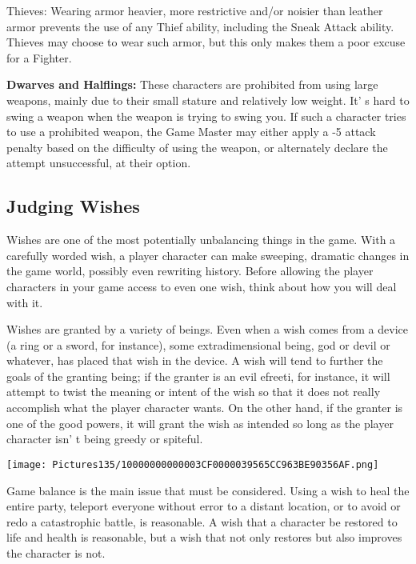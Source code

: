 \documentclass[a4paper,twoside,openany,10pt]{book}
\begin{document}
\begin{multicols}{2}
Thieves: Wearing armor heavier, more restrictive and/or noisier than leather armor prevents the use of any Thief ability, including the Sneak Attack ability. Thieves may choose to wear such armor, but this only makes them a poor excuse for a Fighter.

\textbf{Dwarves and Halflings:} These characters are prohibited from using large weapons, mainly due to their small stature and relatively low weight. It' s hard to swing a weapon when the weapon is trying to swing you. If such a character tries to use a prohibited weapon, the Game Master may either apply a -5 attack penalty based on the difficulty of using the weapon, or alternately declare the attempt unsuccessful, at their option.

\subsection{Judging Wishes}\label{judging-wishes}

Wishes are one of the most potentially unbalancing things in the game.  With a carefully worded wish, a player character can make sweeping, dramatic changes in the game world, possibly even rewriting history. Before allowing the player characters in your game access to even one wish, think about how you will deal with it.

Wishes are granted by a variety of beings. Even when a wish comes from a device (a ring or a sword, for instance), some extradimensional being, god or devil or whatever, has placed that wish in the device. A wish will tend to further the goals of the granting being; if the granter is an evil efreeti, for instance, it will attempt to twist the meaning or intent of the wish so that it does not really accomplish what the player character wants. On the other hand, if the granter is one of the good powers, it will grant the wish as intended so long as the player character isn' t being greedy or spiteful.

\begin{flushleft} \texttt{[image: Pictures135/10000000000003CF0000039565CC963BE90356AF.png]}  \end{flushleft}

Game balance is the main issue that must be considered. Using a wish to heal the entire party, teleport everyone without error to a distant location, or to avoid or redo a catastrophic battle, is reasonable. A wish that a character be restored to life and health is reasonable, but a wish that not only restores but also improves the character is not.


\end{multicols}
\end{document}

